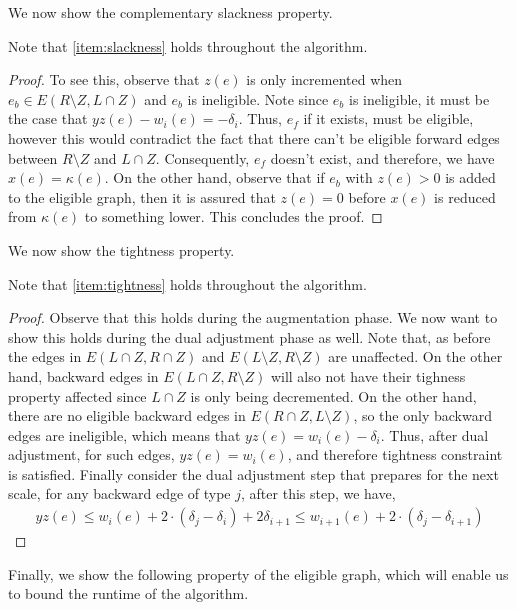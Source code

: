 We now show the complementary slackness property.

\begin{claim2}
Note that \ref{item:slackness} holds throughout the algorithm.
\end{claim2}
\begin{proof}
To see this, observe that $z(e)$ is only incremented when $e_b\in E(R\setminus Z, L\cap Z)$ and $e_b$ is ineligible. Note since $e_b$ is ineligible, it must be the case that $yz(e)-w_i(e)=-\delta_i$. Thus, $e_f$ if it exists, must be eligible, however this would contradict the fact that there can't be eligible forward edges between $R\setminus Z$ and $L\cap Z$. Consequently, $e_f$ doesn't exist, and therefore, we have $x(e)=\kappa(e)$. On the other hand, observe that if $e_b$ with $z(e)>0$ is added to the eligible graph, then it is assured that $z(e)=0$ before $x(e)$ is reduced from $\kappa(e)$ to something lower. This concludes the proof. 
\end{proof}

We now show the tightness property. 

\begin{claim2}
Note that \ref{item:tightness} holds throughout the algorithm. 
\end{claim2}
\begin{proof}
Observe that this holds during the augmentation phase. We now want to show this holds during the dual adjustment phase as well. Note that, as before the edges in $E(L\cap Z, R\cap Z)$ and $E(L\setminus Z, R\setminus Z)$ are unaffected. On the other hand, backward edges in $E(L\cap Z, R\setminus Z)$ will also not have their tighness property affected since $L\cap Z$ is only being decremented. On the other hand, there are no eligible backward edges in $E(R\cap Z, L\setminus Z)$, so the only backward edges are ineligible, which means that $yz(e)=w_{i}(e)-\delta_i$. Thus, after dual adjustment, for such edges, $yz(e)=w_i(e)$, and therefore tightness constraint is satisfied. Finally consider the dual adjustment step that prepares for the next scale, for any backward edge of type $j$, after this step, we have,
\begin{align*}
yz(e)\leqslant w_{i}(e)+2\cdot (\delta_j-\delta_i)+2\delta_{i+1}\leqslant w_{i+1}(e)+2\cdot (\delta_j-\delta_{i+1})
\end{align*}
\end{proof}

Finally, we show the following property of the eligible graph, which will enable us to bound the runtime of the algorithm.

